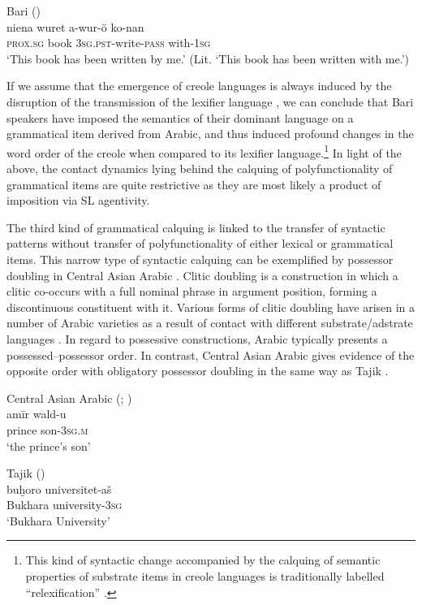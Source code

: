 \documentclass[output=paper]{langsci/langscibook}
\begin{document}
\ea
{Bari (\citealt[65]{Owen1909})}\\
\gll   niena  wuret   a-wur-ö ko-nan \\
       \textsc{prox.sg} book \textsc{3sg.pst}-write-\textsc{pass} with-\textsc{1sg}\\
\glt   `This book has been written by me.' (Lit. ‘This book has been written with me.’)
\z

If we assume that the emergence of creole languages is always induced by the disruption of the transmission of the lexifier language \citep{Comrie2011}, we can conclude that Bari speakers have imposed the semantics of their dominant language on a grammatical item derived from Arabic, and thus induced profound changes in the word order of the creole when compared to its lexifier language.\footnote{This kind of syntactic change accompanied by the calquing of semantic properties of substrate items in creole languages is traditionally labelled ``relexification'' \citep{Lefebvre1998}.}  In light of the above, the contact dynamics lying behind the calquing of polyfunctionality of grammatical items are quite restrictive as they are most likely a product of imposition via SL agentivity.  

The third kind of grammatical calquing is linked to the transfer of syntactic patterns without transfer of polyfunctionality of either lexical or grammatical items. This narrow type of syntactic calquing can be exemplified by possessor doubling in Central Asian Arabic \citep{Ratcliffe2005}. Clitic doubling is a construction in which a clitic co-occurs with a full nominal phrase in argument position, forming a discontinuous constituent with it. Various forms of clitic doubling have arisen in a number of Arabic varieties as a result of contact with different substrate/adstrate languages \citep{Souag2017clitic}. In regard to possessive constructions, Arabic typically presents a possessed–possessor order. In contrast, Central Asian Arabic  gives evidence of the opposite order with obligatory possessor doubling in the same way as Tajik . 

\ea\label{ex:key:28}
{Central Asian Arabic (\citealt{Ratcliffe2005}; \citealt[56]{Souag2017clitic})}\\
\gll   amīr wald-u\\
        prince son-\textsc{3sg.m}\\
\glt   `the prince’s son'
\z

\ea\label{ex:key:29}
{Tajik (\citealt[56]{Souag2017clitic})}\\
\gll   buḫoro universitet-aš\\
       Bukhara university-\textsc{3sg}\\
\glt   `Bukhara University'
\z
\end{document}
